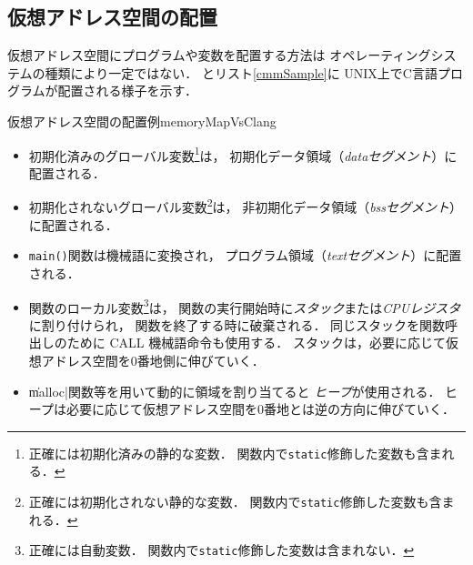 \subsection{仮想アドレス空間の配置}
仮想アドレス空間にプログラムや変数を配置する方法は
オペレーティングシステムの種類により一定ではない．
とリスト\ref{cmmSample}に
UNIX上でC言語プログラムが配置される様子を示す．

{仮想アドレス空間の配置例}{memoryMapVsClang}

\begin{itemize}
\item 初期化済みのグローバル変数\footnote{
正確には初期化済みの静的な変数．
関数内で\texttt{static}修飾した変数も含まれる．}は，
初期化データ領域（\emph{dataセグメント}）に配置される．
\item 初期化されないグローバル変数\footnote{
正確には初期化されない静的な変数．
関数内で\texttt{static}修飾した変数も含まれる．}は，
非初期化データ領域（\emph{bssセグメント}）に配置される．
\item \texttt{main()}関数は機械語に変換され，
プログラム領域（\emph{textセグメント}）に配置される．
\item 関数のローカル変数\footnote{
正確には自動変数．
関数内で\texttt{static}修飾した変数は含まれない．}は，
関数の実行開始時に\emph{スタック}または\emph{CPUレジスタ}に割り付けられ，
関数を終了する時に破棄される．
同じスタックを関数呼出しのために CALL 機械語命令も使用する．
スタックは，必要に応じて仮想アドレス空間を0番地側に伸びていく．
\item \|malloc|関数等を用いて動的に領域を割り当てると
\emph{ヒープ}が使用される．
ヒープは必要に応じて仮想アドレス空間を0番地とは逆の方向に伸びていく．
\end{itemize}


